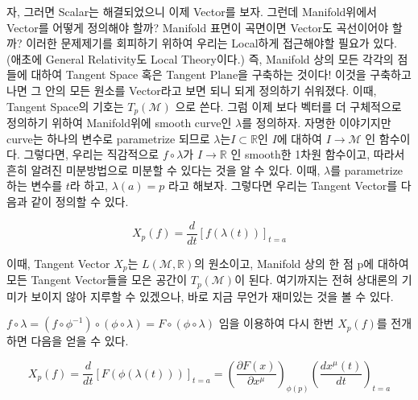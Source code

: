 \documentclass[final]{IEEEphot} %
\numberwithin{equation}{section} %
\numberwithin{figure}{section} %
\numberwithin{table}{section} %
\theoremstyle{plain}
\newcommand{\HS}{\hspace{0.5cm}}
\newcommand{\VS}{\vspace{0.3cm}}
\begin{document}
 \VS
 
 \HS 자, 그러면 Scalar는 해결되었으니 이제 Vector를 보자. 그런데 Manifold위에서 Vector를 어떻게 정의해야 할까? Manifold 표면이 곡면이면 Vector도 곡선이어야 할까?
 이러한 문제제기를 회피하기 위하여 우리는 Local하게 접근해야할 필요가 있다. (애초에 General Relativity도 Local Theory이다.)
 즉, Manifold 상의 모든 각각의 점들에 대하여
 Tangent Space 혹은 Tangent Plane을 구축하는 것이다! 이것을 구축하고 나면 그 안의 모든 원소를 Vector라고 보면 되니 되게 정의하기 쉬워졌다.\footnotemark
 이때, Tangent Space의 기호는   $T_{p} (\mathcal{M})$ 으로 쓴다. 그럼 이제 보다 벡터를 더 구체적으로 정의하기 위하여 Manifold위에 smooth curve인 $\lambda$를 정의하자.
 자명한 이야기지만 curve는 하나의 변수로 parametrize 되므로 $\lambda$는$I\subset\mathbb{R}$인 $I$에 대하여 $I \rightarrow \mathcal{M}$ 인 함수이다. 그렇다면, 우리는
 직감적으로 $ f \circ \lambda$가 $I \rightarrow \mathbb{R}$ 인 smooth한 1차원 함수이고, 따라서 흔히 알려진 미분방법으로 미분할 수 있다는 것을 알 수 있다.
 이때, $\lambda$를 parametrize하는 변수를 $t$라 하고, $\lambda (a) = p$ 라고 해보자. 그렇다면 우리는 Tangent Vector를 다음과 같이 정의할 수 있다.
 
 \begin{equation}
  X_p (f) = \frac{d}{dt} [f(\lambda (t))]_{t=a}
 \end{equation}

 이때, Tangent Vector $X_p$는 $L(\mathcal{M}, \mathbb{R})$의 원소이고,  Manifold 상의 한 점 p에 대하여 모든 Tangent Vector들을 모은 공간이 $T_p (\mathcal{M})$이 된다.
 여기까지는 전혀 상대론의 기미가 보이지 않아 지루할 수 있겠으나, 바로 지금 무언가 재미있는 것을 볼 수 있다.
 
\HS $f\circ\lambda = (f\circ\phi^{-1})\circ (\phi\circ\lambda)=F\circ(\phi\circ\lambda)$ 임을 이용하여 다시 한번 $X_p (f)$를 전개하면 다음을 얻을 수 있다.

\begin{equation}
 \label{eq:tan}
 X_p (f) = \frac{d}{dt}[F(\phi(\lambda (t)))]_{t=a} = \left( \frac{\partial F(x)}{\partial x^{\mu}} \right)_{\phi(p)} \left(\frac{dx^{\mu}(t)}{dt}\right)_{t=a}
\end{equation}
\end{document}
